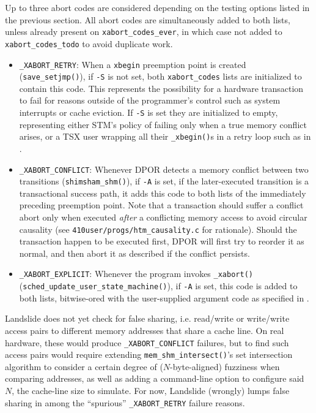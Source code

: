 Up to three abort codes are considered depending on the testing options listed in the previous section.
All abort codes are simultaneously added to both lists,
unless already present on {\tt xabort\_codes\_ever},
in which case not added to {\tt xabort\_codes\_todo} to avoid duplicate work.
\begin{itemize}
	\item {\tt \_XABORT\_RETRY}:
		When a {\tt xbegin} preemption point is created ({\tt save\_setjmp()}),
		if {\tt -S} is not set,
		both {\tt xabort\_codes} lists are initialized to contain this code.
		This represents the possibility for a hardware transaction to fail
		for reasons outside of the programmer's control such as system interrupts or cache eviction.
		If {\tt -S} is set they are initialized to empty,
		representing either STM's policy of failing only when a true memory conflict arises,
		or a TSX user wrapping all their {\tt \_xbegin()}s in a retry loop such as in \cite{sigbovik-htm}.
	\item {\tt \_XABORT\_CONFLICT}:
		Whenever DPOR detects a memory conflict between two transitions ({\tt shimsham\_shm()}),
		if {\tt -A} is set,
		if the later-executed transition is a transactional success path,
		it adds this code to both lists of the immediately preceding preemption point.
		Note that a transaction should suffer a conflict abort
		only when executed {\em after} a conflicting memory access
		to avoid circular causality
		(see {\tt 410user/progs/htm\_causality.c} for rationale).
		Should the transaction happen to be executed first,
		DPOR will first try to reorder it as normal,
		and then abort it as described if the conflict persists.
	\item {\tt \_XABORT\_EXPLICIT}:
		Whenever the program invokes {\tt \_xabort()} ({\tt sched\_update\_user\_\allowbreak{}state\_machine()}),
		if {\tt -A} is set,
		this code is added to both lists, bitwise-ored with the user-supplied argument code
		as specified in \cite{htm-gcc}.
\end{itemize}

Landslide does not yet check for false sharing,
i.e. read/write or write/write access pairs to different memory addresses that share a cache line.
On real hardware, these would produce {\tt \_XABORT\_CONFLICT} failures,
but to find such access pairs would require extending {\tt mem\_shm\_intersect()}'s set intersection algorithm
to consider a certain degree of ($N$-byte-aligned) fuzziness when comparing addresses,
as well as adding a command-line option to configure said $N$, the cache-line size to simulate.
For now, Landslide (wrongly) lumps false sharing in among the ``spurious'' {\tt \_XABORT\_RETRY} failure reasons.

